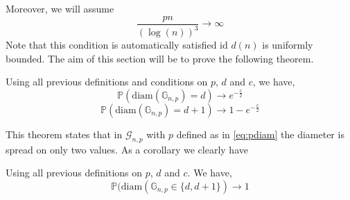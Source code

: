 Moreover, we will assume
\begin{equation}\label{eq:logtrois}
	\frac{pn}{(\log(n))^3} \longrightarrow \infty
\end{equation}
Note that this condition is automatically satisfied id $d(n)$ is uniformly bounded.
The aim of this section will be to prove the following theorem.
\begin{theorem}\label{th:diam2}
	Using all previous definitions and conditions on $p$, $d$ and $c$, we have,
	\begin{equation}
		\mathbb{P}(\text{diam}(\mathbb{G}_{n, p}) = d) \longrightarrow e^{-\frac{c}{2}}
	\end{equation}	
	\begin{equation}
		\mathbb{P}(\text{diam}(\mathbb{G}_{n,p}) = d + 1) \longrightarrow 1 - e^{-\frac{c}{2}}
	\end{equation}
\end{theorem}
This theorem states that in $\mathcal{G}_{n,p}$ with $p$ defined as in \eqref{eq:pdiam} the diameter is spread on only two values.
As a corollary we clearly have
\begin{corollary}
	Using all previous definitions on $p$, $d$ and $c$. We have,
	\begin{equation}
		\mathbb{P}(\text{diam}(\mathbb{G}_{n,p} \in \{d, d+1\}) \longrightarrow 1
	\end{equation}
\end{corollary}

